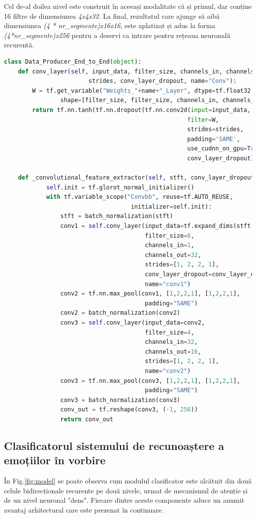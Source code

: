 \documentclass[a4paper,12pt]{book}
\begin{document}
				Cel de-al doilea nivel este construit în aceeași modalitate că și primul, dar conține 16 filtre de dimensiunea \textit{4x4x32}. La final, rezultatul care ajunge să aibă dimensiunea \textit{(4 * nr\_segmente)x16x16}, este aplatizat și adus la forma \textit{(4*nr\_segmente)x256} pentru a deservi ca intrare pentru rețeaua neuronală recurentă. 
				\begin{lstlisting}[language=Python, caption={Implementarea nivelelor convoluționale care realizează extragerea caracteristicilor în manieră "end-to-end" folosind procedurile librăriei Tensorflow.}, xleftmargin=-1cm, label=cnn_code]
class Data_Producer_End_to_End(object):
	def conv_layer(self, input_data, filter_size, channels_in, channels_out, 
						strides, conv_layer_dropout, name="Conv"):
		W = tf.get_variable("Weights_"+name+"_Layer", dtype=tf.float32, 
				shape=[filter_size, filter_size, channels_in, channels_out])
		return tf.nn.tanh(tf.nn.dropout(tf.nn.conv2d(input=input_data, 
													filter=W, 
													strides=strides, 
													padding='SAME', 
													use_cudnn_on_gpu=True), 
													conv_layer_dropout))
					
	def _convolutional_feature_extractor(self, stft, conv_layer_dropout):
			self.init = tf.glorot_normal_initializer()
			with tf.variable_scope("Convbb", reuse=tf.AUTO_REUSE, 
									initializer=self.init):
				stft = batch_normalization(stft)
				conv1 = self.conv_layer(input_data=tf.expand_dims(stft,axis=3),
										filter_size=8, 
										channels_in=1, 
										channels_out=32, 
										strides=[1, 2, 2, 1], 
										conv_layer_dropout=conv_layer_dropout, 
										name="conv1")			
				conv2 = tf.nn.max_pool(conv1, [1,2,2,1], [1,2,2,1], 
										padding="SAME")
				conv2 = batch_normalization(conv2)
				conv3 = self.conv_layer(input_data=conv2, 
										filter_size=4, 
										channels_in=32,
										channels_out=16, 
										strides=[1, 2, 2, 1], 										conv_layer_dropout=conv_layer_dropout, 
										name="conv2")				
				conv3 = tf.nn.max_pool(conv3, [1,2,2,1], [1,2,2,1], 
										padding="SAME")
				conv3 = batch_normalization(conv3)
				conv_out = tf.reshape(conv3, (-1, 256))
				return conv_out	\end{lstlisting}		
			
			\subsection{Clasificatorul sistemului de recunoaștere a emoțiilor în vorbire} \label{clasif_prac}
				În Fig.\ref{fig:model} se poate observa cum modulul clasificator este alcătuit din două celule bidirecționale recurente pe două nivele, urmat de mecanismul de atenție și de un nivel neuronal "dens". Fiecare dintre aceste componente aduce un anumit avantaj arhitectural care este prezenat în continuare. \par 
				
\end{document}
